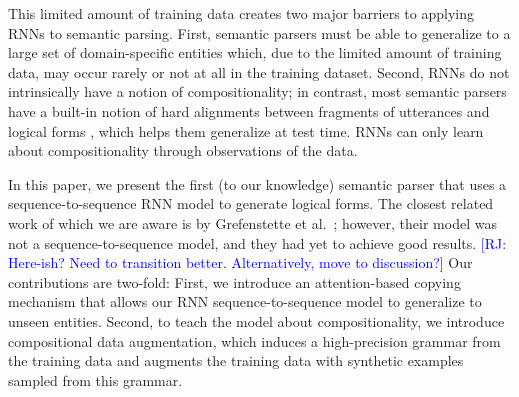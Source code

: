 \documentclass[11pt,letterpaper]{article}
\newcommand\pl[1]{\textcolor{red}{[PL: #1]}}
\newcommand\rj[1]{\textcolor{blue}{[RJ: #1]}}
\begin{document}
This limited amount of training data
creates two major barriers to applying RNNs to semantic parsing.
First, semantic parsers must be able to generalize to a large set of 
domain-specific entities which, due to the limited
amount of training data, may occur rarely or not at all
in the training dataset.
Second, RNNs do not intrinsically have a notion of compositionality;
in contrast, most semantic parsers have a built-in notion of
hard alignments between fragments of utterances and logical forms
\cite{zettlemoyer05ccg,berant2013freebase},
which helps them generalize at test time.
RNNs can only learn about compositionality through observations of the data.


In this paper, we present the first (to our knowledge)
semantic parser that uses a sequence-to-sequence RNN model to generate
logical forms.  
The closest related work of which we are aware is
by Grefenstette et al.~;
however, their model was not a sequence-to-sequence model,
and they had yet to achieve good results.
\rj{Here-ish?  Need to transition better.  Alternatively, move to discussion?}
Our contributions are two-fold:
First, we introduce an attention-based copying mechanism 
that allows our RNN sequence-to-sequence model to generalize to unseen entities.
Second, to teach the model about compositionality,
we introduce compositional data augmentation,
which induces a high-precision grammar from the training data
and augments the training data with synthetic examples sampled from this grammar.

\end{document}
